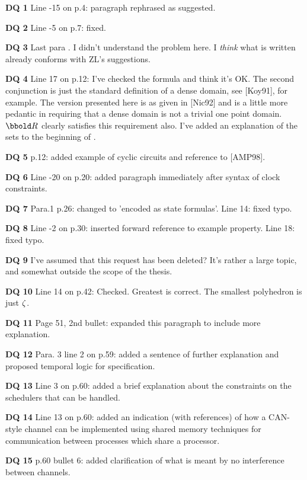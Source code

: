 \documentclass{article}
\begin{document}
\begin{trivlist}
\item[\bf DQ 1] Line -15 on p.4: paragraph rephrased as suggested.
\item[\bf DQ 2] Line -5 on p.7: fixed.
\item[\bf DQ 3] Last para . I didn't understand the problem
here. I \emph{think} what is written already conforms with ZL's suggestions.
\item[\bf DQ 4] Line 17 on p.12: I've checked the formula and think it's
OK. The second conjunction is just the standard definition of a dense
domain, see [Koy91], for example. The version presented here is as
given in [Nic92] and is a little more pedantic in requiring that a
dense domain is not a trivial one point domain. $\Time$ clearly
satisfies this requirement also. I've added an explanation of the sets
to the beginning of .
\item[\bf DQ 5] p.12: added example of cyclic circuits and reference
to [AMP98].
\item[\bf DQ 6] Line -20 on p.20: added paragraph immediately after
syntax of clock constraints.
\item[\bf DQ 7] Para.1 p.26: changed to 'encoded as state formulas'.
Line 14: fixed typo.
\item[\bf DQ 8] Line -2 on p.30: inserted forward reference to example
property. Line 18: fixed typo.
\item[\bf DQ 9] I've assumed that this request has been deleted? It's
rather a large topic, and somewhat outside the scope of the thesis.
\item[\bf DQ 10] Line 14 on p.42: Checked. Greatest is correct. The
smallest polyhedron is just ${\zeta}$.
\item[\bf DQ 11] Page 51, 2nd bullet: expanded this paragraph to include
more explanation.
\item[\bf DQ 12] Para. 3 line 2 on p.59: added a sentence of further 
explanation and proposed temporal logic for specification.
\item[\bf DQ 13] Line 3 on p.60: added a brief explanation about the
constraints on the schedulers that can be handled.
\item[\bf DQ 14] Line 13 on p.60: added an indication (with
references) of how a CAN-style channel can be implemented using shared
memory techniques for communication between processes which share a
processor.
\item[\bf DQ 15] p.60 bullet 6: added clarification of what is meant
by no interference between channels.

\end{trivlist}
\end{document}
